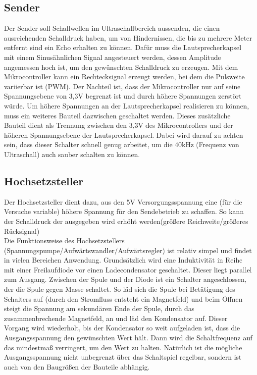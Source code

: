 \subsection{Sender}
Der Sender soll Schallwellen im Ultraschallbereich aussenden, die einen ausreichenden Schalldruck haben, um von Hindernissen, die bis zu mehrere Meter entfernt sind ein Echo erhalten zu können.
Dafür muss die Lautsprecherkapsel mit einem Sinusähnlichen Signal angesteuert werden, dessen Amplitude angemessen hoch ist, um den gewünschten Schalldruck zu erzeugen. Mit dem Mikrocontroller kann ein Rechtecksignal erzeugt werden, bei dem die Pulsweite variierbar ist (PWM). Der Nachteil ist, dass der Mikrocontroller nur auf seine Spannungsebene von 3,3V begrenzt ist und durch höhere Spannungen zerstört würde.
Um höhere Spannungen an der Lautsprecherkapsel realisieren zu können, muss ein weiteres Bauteil dazwischen geschaltet werden. Dieses zusätzliche Bauteil dient als Trennung zwischen den 3,3V des Mikrocontrollers und der höheren Spannungsebene der Lautsprecherkapsel. Dabei wird darauf zu achten sein, dass dieser Schalter schnell genug arbeitet, um die 40kHz (Frequenz von Ultraschall) auch sauber schalten zu können.

\subsection{Hochsetzsteller}
Der Hochsetzsteller dient dazu, aus den 5V Versorgungsspannung eine (für die Versuche variable) höhere Spannung für den Sendebetrieb zu schaffen. So kann der Schalldruck der ausgegeben wird erhöht werden(größere Reichweite/größeres Rücksignal)\\
Die Funktionsweise des Hochsetzstellers (Spannungspumpe/Aufwärtswandler/Aufwärtsregler) ist relativ simpel und findet in vielen Bereichen Anwendung. Grundsätzlich wird eine Induktivität in Reihe mit einer Freilaufdiode vor einen Ladecondensator geschaltet. Dieser liegt parallel zum Ausgang. Zwischen der Spule und der Diode ist ein Schalter angeschlossen, der die Spule gegen Masse schaltet. So läd sich die Spule bei Betätigung des Schalters auf (durch den Stromfluss entsteht ein Magnetfeld) und beim Öffnen steigt die Spannung am sekundären Ende der Spule, durch das zusammenbrechende Magnetfeld, an und läd den Kondensator auf. Dieser Vorgang wird wiederholt, bis der Kondensator so weit aufgeladen ist, dass die Ausgangsspannung den gewünschten Wert hält. Dann wird die Schaltfrequenz auf das mindestmaß verringert, um den Wert zu halten. Natürlich ist die mögliche Ausgangsspannung nicht unbegrenzt über das Schaltspiel regelbar, sondern ist auch von den Baugrößen der Bauteile abhängig. 
